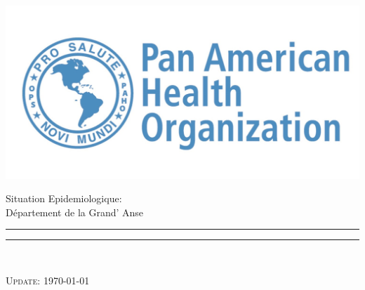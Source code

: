 \begin{titlepage}
\hspace*{-1cm}\begin{minipage}[0.1\textheight]{5cm}
\vspace{0pt}
\includegraphics[height=0.1\textheight]{./figure/logo_paho.jpg}
\end{minipage}
\hspace*{1cm}\begin{minipage}{11.3cm}
\vspace{0pt}
\begin{flushright}
\begin{spacing}{1.0}
{\LARGE Situation Epidemiologique:} \\
{\LARGE Département de la Grand’ Anse}
\end{spacing}
\end{flushright}
\end{minipage}

\hspace*{-1cm}\begin{minipage}[t]{5cm}
\vspace{0pt}
\textcolor{whoblue!15}{\rule{5cm}{0.55\textheight}}
\end{minipage}
\hspace*{1cm}\begin{minipage}[t]{11.3cm}
\vspace{0pt}
\textcolor{whoblue}{\rule{11.3cm}{0.5mm}}\\[0.525\textheight]
\begin{flushright}
\cleanlookdateon \textsc{\large Update: \today}
\end{flushright}
\end{minipage}

\end{titlepage}
